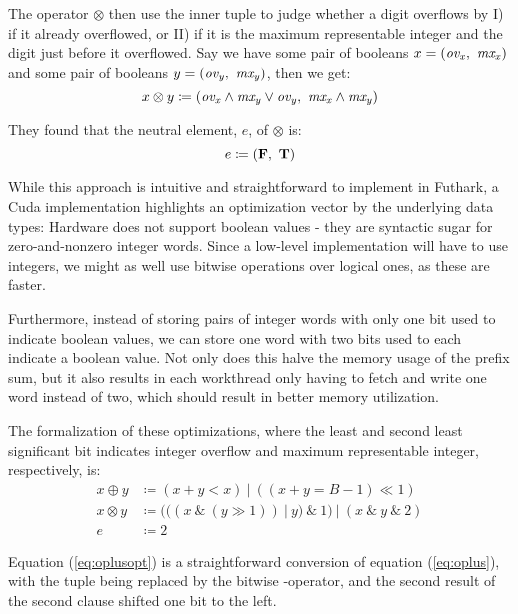 The operator $\otimes$ then use the inner tuple to judge whether a digit overflows by I) if it already overflowed, or II) if it is the maximum representable integer and the digit just before it overflowed. Say we have some pair of booleans $x = (\mathit{ov_x},~\mathit{mx_{x}})$ and some pair of booleans $y = (\mathit{ov_y},~\mathit{mx_{y}})$, then we get:
\begin{equation}
  \label{eq:otimes}
  x \otimes y \coloneq (\mathit{ov_x} \land \mathit{mx_y} \lor \mathit{ov_y},~\mathit{mx_x} \land \mathit{mx_y})
\end{equation}

They found that the neutral element, $e$, of $\otimes$ is:
\begin{equation}
  \label{eq:otimesne}
  e \coloneq (\mathbf{F},~\mathbf{T})
\end{equation}

While this approach is intuitive and straightforward to implement in Futhark, a Cuda implementation highlights an optimization vector by the underlying data types: Hardware does not support boolean values - they are syntactic sugar for zero-and-nonzero integer words. Since a low-level implementation will have to use integers, we might as well use bitwise operations over logical ones, as these are faster.

Furthermore, instead of storing pairs of integer words with only one bit used to indicate boolean values, we can store one word with two bits used to each indicate a boolean value. Not only does this halve the memory usage of the prefix sum, but it also results in each workthread only having to fetch and write one word instead of two, which should result in better memory utilization.

The formalization of these optimizations, where the least and second least significant bit indicates integer overflow and maximum representable integer, respectively, is:
\begin{align}
  \label{eq:oplusopt}
  x \oplus y &\coloneq (x + y < x)~|~((x + y = B-1) \ll 1) \\
  \label{eq:otimesopt}
  x \otimes y &\coloneq (((x~\&~(y \gg 1))~|~y)~\&~1)~|~(x~\&~y~\&~2)\\
  \label{eq:otimesneopt}
  e &\coloneq 2
\end{align}

Equation (\ref{eq:oplusopt}) is a straightforward conversion of equation (\ref{eq:oplus}), with the tuple being replaced by the bitwise -operator, and the second result of the second clause shifted one bit to the left.

